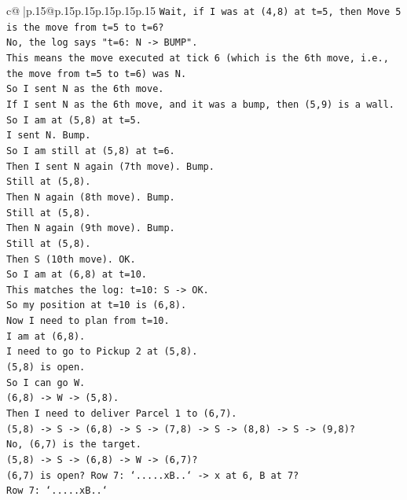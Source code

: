 \documentclass{article}
\begin{document}
{\begin{supertabular}{c@{$\;$}|p{.15\linewidth}@{}p{.15\linewidth}p{.15\linewidth}p{.15\linewidth}p{.15\linewidth}p{.15\linewidth}}
{{{\texttt{Wait, if I was at (4,8) at t=5, then Move 5 is the move from t=5 to t=6?} \\
\texttt{No, the log says "t=6: N {-}> BUMP".} \\
\texttt{This means the move executed at tick 6 (which is the 6th move, i.e., the move from t=5 to t=6) was N.} \\
\texttt{So I sent N as the 6th move.} \\
\texttt{If I sent N as the 6th move, and it was a bump, then (5,9) is a wall.} \\
\texttt{So I am at (5,8) at t=5.} \\
\texttt{I sent N. Bump.} \\
\texttt{So I am still at (5,8) at t=6.} \\
\texttt{Then I sent N again (7th move). Bump.} \\
\texttt{Still at (5,8).} \\
\texttt{Then N again (8th move). Bump.} \\
\texttt{Still at (5,8).} \\
\texttt{Then N again (9th move). Bump.} \\
\texttt{Still at (5,8).} \\
\texttt{Then S (10th move). OK.} \\
\texttt{So I am at (6,8) at t=10.} \\
\texttt{This matches the log: t=10: S {-}> OK.} \\
\texttt{So my position at t=10 is (6,8).} \\
\texttt{Now I need to plan from t=10.} \\
\texttt{I am at (6,8).} \\
\texttt{I need to go to Pickup 2 at (5,8).} \\
\texttt{(5,8) is open.} \\
\texttt{So I can go W.} \\
\texttt{(6,8) {-}> W {-}> (5,8).} \\
\texttt{Then I need to deliver Parcel 1 to (6,7).} \\
\texttt{(5,8) {-}> S {-}> (6,8) {-}> S {-}> (7,8) {-}> S {-}> (8,8) {-}> S {-}> (9,8)?} \\
\texttt{No, (6,7) is the target.} \\
\texttt{(5,8) {-}> S {-}> (6,8) {-}> W {-}> (6,7)?} \\
\texttt{(6,7) is open? Row 7: `.....xB..` {-}> x at 6, B at 7?} \\
\texttt{Row 7: `.....xB..`} \\
}}}
\end{supertabular}}
\end{document}
